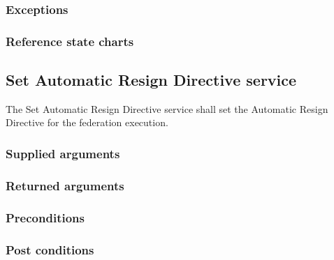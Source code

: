 \begin{compactstdpage}

    \subsubsection{Exceptions}


    \subsubsection{Reference state charts}


    \subsection{Set Automatic Resign Directive service}

    The Set Automatic Resign Directive service shall set the Automatic Resign Directive for the federation execution.

    \subsubsection{Supplied arguments}


    \subsubsection{Returned arguments}


    \subsubsection{Preconditions}


    \subsubsection{Post conditions}


\end{compactstdpage}
